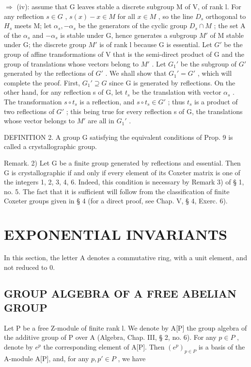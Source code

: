 \begin{enumerate}
  \(\Longrightarrow\) (iv): assume that G leaves stable a discrete subgroup M of V, of rank l. For any reflection \(s \in G\) , \(s(x) - x \in M\) for all \(x \in M\) , so the line \(D_{s}\) orthogonal to \(H_{s}\) meets M; let \(\alpha_{s}, -\alpha_{s}\) be the generators of the cyclic group \(D_{s} \cap M\) ; the set A of the \(\alpha_{s}\) and \(-\alpha_{s}\) is stable under G, hence generates a subgroup \(M'\) of M stable under G; the discrete group \(M'\) is of rank l because G is essential. Let \(G'\) be the group of affine transformations of V that is the semi-direct product of G and the group of translations whose vectors belong to \(M'\) . Let \(G_{1}'\) be the subgroup of \(G'\) generated by the reflections of \(G'\) . We shall show that \(G_{1}' = G'\) , which will complete the proof. First, \(G_{1}' \supseteq G\) since G is generated by reflections. On the other hand, for any reflection s of G, let \(t_{s}\) be the translation with vector \(\alpha_{s}\) . The transformation \(s \circ t_{s}\) is a reflection, and \(s \circ t_{s} \in G'\) ; thus \(t_{s}\) is a product of two reflections of \(G'\) ; this being true for every reflection s of G, the translations whose vector belongs to \(M'\) are all in \(G_{1}'\) .
\end{enumerate}

DEFINITION 2. A group G satisfying the equivalent conditions of Prop. 9 is called a crystallographic group.

Remark. 2) Let G be a finite group generated by reflections and essential. Then G is crystallographic if and only if every element of its Coxeter matrix is one of the integers 1, 2, 3, 4, 6. Indeed, this condition is necessary by Remark 3) of § 1, no. 5. The fact that it is sufficient will follow from the classification of finite Coxeter groups given in § 4 (for a direct proof, see Chap. V, § 4, Exerc. 6).

\section{EXPONENTIAL INVARIANTS}

In this section, the letter A denotes a commutative ring, with a unit element, and not reduced to 0.

\subsection{GROUP ALGEBRA OF A FREE ABELIAN GROUP}

Let P be a free Z-module of finite rank l. We denote by A{[}P{]} the group algebra of the additive group of P over A (Algebra, Chap. III, § 2, no. 6). For any \(p \in P\) , denote by \(e^{p}\) the corresponding element of A{[}P{]}. Then \((e^{p})_{p \in P}\) is a basis of the A-module A{[}P{]}, and, for any \(p, p' \in P\) , we have

